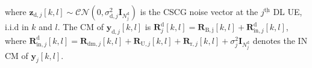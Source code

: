 \documentclass[10pt,journal]{IEEEtran}
\newcommand{\paren}[1]{\left({#1}\right)}
\newcommand{\bracket}[1]{{\left [{#1}\right ]}}
\newcommand{\ith}[1]    {{#1}^{\underline{\text{th}}}}
\theoremstyle{definition}
\begin{document}
where $\mathbf{z}_{\textrm{d},j}\bracket{k,l}\sim\mathcal{CN}\paren{0,\sigma^2_{\mathrm{d},j}\mathbf{I}_{N^\mathrm{d}_{j}}}$ is the CSCG noise vector at the $\ith{j}$ DL UE, i.i.d in $k$ and $l$. The CM of $\mathbf{y}_{\textrm{d},j}\bracket{k,l}$ is $\mathbf{R}^\mathrm{d}_j\bracket{k,l}=\mathbf{R}_{\mathrm{B,j}}\bracket{k,l}+\mathbf{R}^\mathrm{d}_{\mathrm{in,}j}\bracket{k,l}$, where $	\mathbf{R}^\textrm{d}_{\mathrm{in},j}\bracket{k,l}=\mathbf{R}_{\mathrm{dm},j}\bracket{k,l}+\mathbf{R}_{\mathrm{U,}j}\bracket{k,l}+\mathbf{R}_{\mathrm{r},j}\bracket{k,l}+\sigma^2_j\mathbf{I}_{\mathit{N}^{\textrm{d}}_j}$ denotes the IN CM of $\mathbf{y}_{j}\bracket{k,l}$.   %
	
\end{document}
